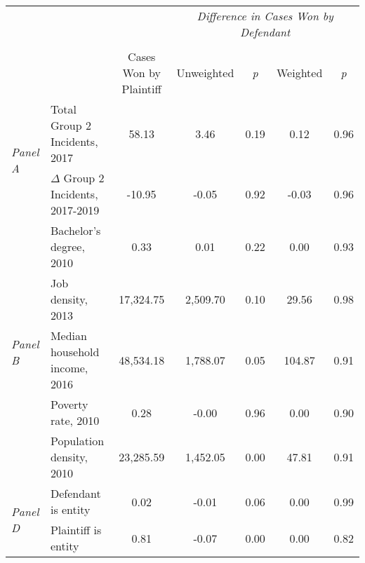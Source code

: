 \begin{tabular}{llccccc}
\toprule
 &  & \textit{} & \multicolumn{4}{c}{\textit{Difference in Cases Won by Defendant}} \\
\cline{4-7}
\\
 &  & Cases Won by Plaintiff & Unweighted & \emph{p} & Weighted & \emph{p} \\
\midrule
\multirow[c]{2}{3cm}{\textit{Panel A}} & Total Group 2 Incidents, 2017 & 58.13 & 3.46 & 0.19 & 0.12 & 0.96 \\
 & $\Delta$ Group 2 Incidents, 2017-2019 & -10.95 & -0.05 & 0.92 & -0.03 & 0.96 \\
\cline{1-7}
\multirow[c]{5}{3cm}{\textit{Panel B}} & Bachelor's degree, 2010 & 0.33 & 0.01 & 0.22 & 0.00 & 0.93 \\
 & Job density, 2013 & 17,324.75 & 2,509.70 & 0.10 & 29.56 & 0.98 \\
 & Median household income, 2016 & 48,534.18 & 1,788.07 & 0.05 & 104.87 & 0.91 \\
 & Poverty rate, 2010 & 0.28 & -0.00 & 0.96 & 0.00 & 0.90 \\
 & Population density, 2010 & 23,285.59 & 1,452.05 & 0.00 & 47.81 & 0.91 \\
\cline{1-7}
\multirow[c]{2}{3cm}{\textit{Panel D}} & Defendant is entity & 0.02 & -0.01 & 0.06 & 0.00 & 0.99 \\
 & Plaintiff is entity & 0.81 & -0.07 & 0.00 & 0.00 & 0.82 \\
\cline{1-7}
\bottomrule
\end{tabular}
